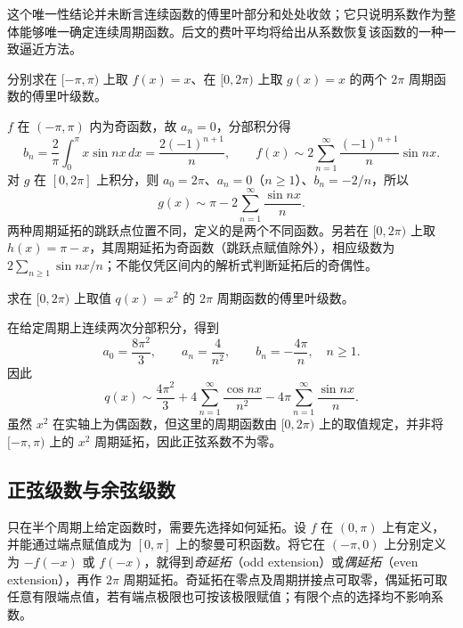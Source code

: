 \documentclass[UTF8,12pt,a4paper,fontset=fandol]{ctexbook}
\begin{document}
这个唯一性结论并未断言连续函数的傅里叶部分和处处收敛；它只说明系数作为整体能够唯一确定连续周期函数。后文的费叶平均将给出从系数恢复该函数的一种一致逼近方法。

\begin{example}
\label{ex:fourier-sawtooth-and-period-choice}
分别求在 $[-\pi,\pi)$ 上取 $f(x)=x$、在 $[0,2\pi)$ 上取 $g(x)=x$ 的两个 $2\pi$ 周期函数的傅里叶级数。
\end{example}

\begin{solve}
$f$ 在 $(-\pi,\pi)$ 内为奇函数，故 $a_n=0$，分部积分得
\[
    b_n=\frac2\pi\int_0^\pi x\sin nx\,dx
        =\frac{2(-1)^{n+1}}n,
    \qquad
    f(x)\sim2\sum_{n=1}^\infty\frac{(-1)^{n+1}}n\sin nx.
\]
对 $g$ 在 $[0,2\pi]$ 上积分，则 $a_0=2\pi$、$a_n=0$（$n\geq1$）、$b_n=-2/n$，所以
\[
    g(x)\sim\pi-2\sum_{n=1}^\infty\frac{\sin nx}{n}.
\]
两种周期延拓的跳跃点位置不同，定义的是两个不同函数。另若在 $[0,2\pi)$ 上取 $h(x)=\pi-x$，其周期延拓为奇函数（跳跃点赋值除外），相应级数为 $2\sum_{n\geq1}\sin nx/n$；不能仅凭区间内的解析式判断延拓后的奇偶性。
\end{solve}

\begin{example}
\label{ex:fourier-square-on-shifted-period}
求在 $[0,2\pi)$ 上取值 $q(x)=x^2$ 的 $2\pi$ 周期函数的傅里叶级数。
\end{example}

\begin{solve}
在给定周期上连续两次分部积分，得到
\[
    a_0=\frac{8\pi^2}{3},\qquad
    a_n=\frac4{n^2},\qquad b_n=-\frac{4\pi}{n},\quad n\geq1.
\]
因此
\begin{equation}
    q(x)\sim\frac{4\pi^2}{3}
       +4\sum_{n=1}^\infty\frac{\cos nx}{n^2}
       -4\pi\sum_{n=1}^\infty\frac{\sin nx}{n}.
    \label{eq:fourier-square-shifted-period}
\end{equation}
虽然 $x^2$ 在实轴上为偶函数，但这里的周期函数由 $[0,2\pi)$ 上的取值规定，并非将 $[-\pi,\pi)$ 上的 $x^2$ 周期延拓，因此正弦系数不为零。
\end{solve}

\subsection{正弦级数与余弦级数}
\label{subsec:sine-and-cosine-series}

只在半个周期上给定函数时，需要先选择如何延拓。设 $f$ 在 $(0,\pi)$ 上有定义，并能通过端点赋值成为 $[0,\pi]$ 上的黎曼可积函数。将它在 $(-\pi,0)$ 上分别定义为 $-f(-x)$ 或 $f(-x)$，就得到\emph{奇延拓}（odd extension）或\emph{偶延拓}（even extension），再作 $2\pi$ 周期延拓。奇延拓在零点及周期拼接点可取零，偶延拓可取任意有限端点值，若有端点极限也可按该极限赋值；有限个点的选择均不影响系数。
\end{document}
